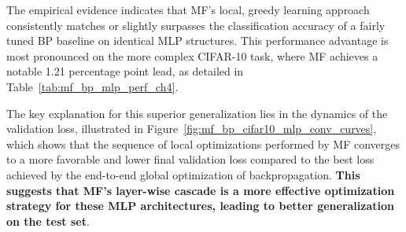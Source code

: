The empirical evidence indicates that MF's local, greedy learning approach consistently matches or slightly surpasses the classification accuracy of a fairly tuned BP baseline on identical MLP structures. This performance advantage is most pronounced on the more complex CIFAR-10 task, where MF achieves a notable 1.21 percentage point lead, as detailed in Table~\ref{tab:mf_bp_mlp_perf_ch4}.

\begin{table}[htbp]
    \centering
    \caption{Performance Comparison: MF vs. BP on Native MLP Architectures (Mean ± Std Dev over 3 runs).}
    \label{tab:mf_bp_mlp_perf_ch4}
    \caption*{\footnotesize Effective Epochs: Sum of layer-wise epochs for MF, global epochs for BP. Best results in each comparison group are in \textbf{bold}. For accuracy, higher is better; for epochs, lower is better.}
\end{table}

The key explanation for this superior generalization lies in the dynamics of the validation loss, illustrated in Figure~\ref{fig:mf_bp_cifar10_mlp_conv_curves}, which shows that the sequence of local optimizations performed by MF converges to a more favorable and lower final validation loss compared to the best loss achieved by the end-to-end global optimization of backpropagation. \textbf{This suggests that MF's layer-wise cascade is a more effective optimization strategy for these MLP architectures, leading to better generalization on the test set}.

